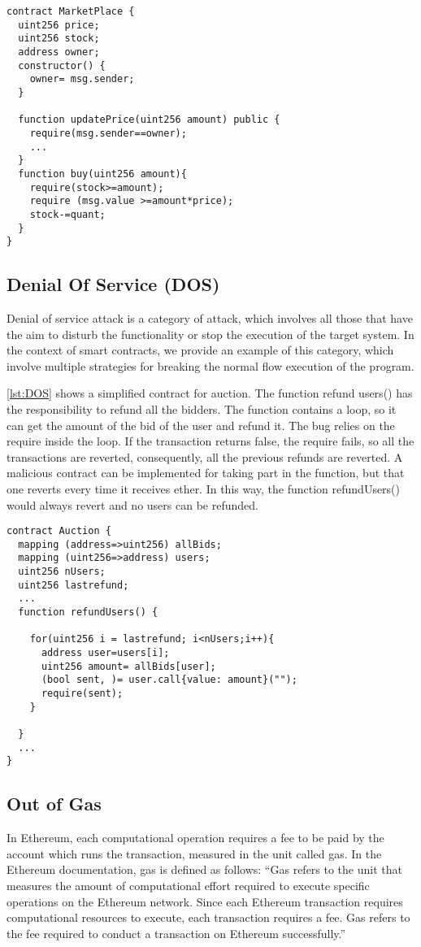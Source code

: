 \documentclass[a4paper,sigconf, language=french,
language=german, language=spanish, language=english]{acmart}
\begin{document}
\begin{lstlisting}[language=Solidity,caption={Transaction Ordering Dependence},label={lst:TOD}]
contract MarketPlace {
  uint256 price;
  uint256 stock;
  address owner;
  constructor() {
    owner= msg.sender;
  }
  
  function updatePrice(uint256 amount) public {
    require(msg.sender==owner);
    ...
  }
  function buy(uint256 amount){
    require(stock>=amount);
    require (msg.value >=amount*price);
    stock-=quant;
  }
}
\end{lstlisting}

\subsection{Denial Of Service (DOS)} 
Denial of service attack is a category of attack, which involves all those that have the aim to 
disturb the functionality or stop the execution of the target system. In the context of smart contracts, we provide an example of this category, 
which involve multiple strategies for breaking the normal flow execution of the program.

\autoref{lst:DOS} shows a simplified contract for auction. The function refund users() has the responsibility to refund all the bidders. 
The function contains a loop, so it can get the amount of the bid of the user and refund it. The bug relies on the require inside the loop. If the transaction returns false, 
the require fails, so all the transactions are reverted, consequently, all the previous refunds are reverted. A malicious contract can be implemented for taking part in the function, but 
that one reverts every time it receives ether. In this way, the function refundUsers() would always revert and no users can be refunded.

\begin{lstlisting}[language=Solidity,caption={Denial of Service/Out of Gas},label={lst:DOS}]
contract Auction {
  mapping (address=>uint256) allBids;
  mapping (uint256=>address) users;
  uint256 nUsers;
  uint256 lastrefund;
  ... 
  function refundUsers() {
    
    for(uint256 i = lastrefund; i<nUsers;i++){
      address user=users[i];
      uint256 amount= allBids[user];
      (bool sent, )= user.call{value: amount}("");
      require(sent);
    }

  }
  ... 
}
\end{lstlisting}


\subsection{Out of Gas} 
In Ethereum, each computational operation requires a fee to be paid by the account which runs the transaction, measured in the unit called gas. 
In the Ethereum documentation, gas is defined as follows: “Gas refers to the unit that measures the amount of computational effort required to execute specific operations on the Ethereum network. 
Since each Ethereum transaction requires computational resources to execute, each transaction requires a fee. 
Gas refers to the fee required to conduct a transaction on Ethereum successfully.” 
\end{document}
